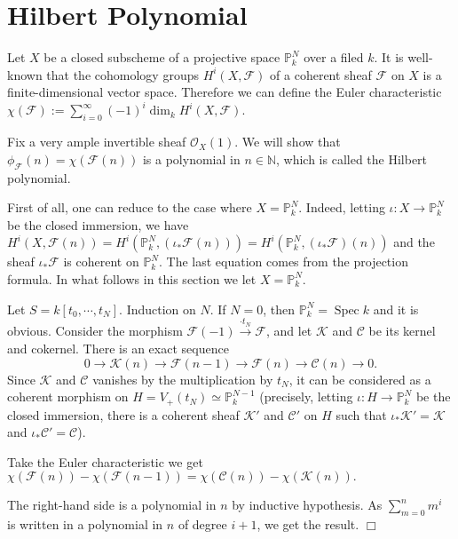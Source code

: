 \documentclass{article}
\theoremstyle{theorem}
\begin{document}
    \section{Hilbert Polynomial}
    Let $X$ be a closed subscheme of a projective space $\mathbb{P}^N_k$ over a filed $k$. It is well-known that the cohomology groups $H^i(X, \mathcal{F})$ of a coherent sheaf $\mathcal F$ on $X$ is a finite-dimensional vector space. Therefore we can define the Euler characteristic $\displaystyle \chi(\mathcal F) := \sum_{i = 0}^{\infty} (-1)^i \dim_k H^i(X, \mathcal{F}).$
    
    Fix a very ample invertible sheaf $\mathcal{O}_X(1)$. We will show that $\phi_{\mathcal F}(n) = \chi(\mathcal F(n))$ is a polynomial in $n \in \mathbb N$, which is called the Hilbert polynomial.
    \newline
    
    First of all, one can reduce to the case where $X =\mathbb{P}^N_k.$ Indeed, letting $\iota : X \rightarrow \mathbb{P}^N_k$ be the closed immersion, we have $H^i(X, \mathcal{F}(n)) = H^i(\mathbb P^N_k, (\iota_*\mathcal{F}(n))) = H^i(\mathbb P^N_k, (\iota_*\mathcal{F})(n))$ and the sheaf $\iota_*\mathcal F$ is coherent on $\mathbb{P}^N_k$. The last equation comes from the projection formula. In what follows in this section we let $X =\mathbb{P}^N_k.$
    
    Let $S = k[t_0, \cdots, t_N]$. Induction on $N$. If $N = 0$, then $\mathbb{P}^N_k = \operatorname{Spec} k$ and it is obvious. Consider the morphism $\mathcal F(-1) \xrightarrow{\cdot t_N} \mathcal F$, and let $\mathcal K$ and $\mathcal C$ be its kernel and cokernel. There is an exact sequence
    $$ 0 \rightarrow \mathcal K(n) \rightarrow \mathcal F(n-1) \rightarrow \mathcal F(n) \rightarrow \mathcal C(n) \rightarrow 0.$$
    Since $\mathcal K$ and $\mathcal C$ vanishes by the multiplication by $t_N$, it can be considered as a coherent morphism on $H = V_+(t_N) \simeq \mathbb{P}^{N-1}_k$ (precisely, letting $\iota : H \rightarrow \mathbb{P}^{N}_k$ be the closed immersion, there is a coherent sheaf $\mathcal K'$ and $\mathcal C'$ on $H$ such that $\iota_*\mathcal K' = \mathcal K$ and $\iota_*\mathcal C' = \mathcal C$).
    
    Take the Euler characteristic we get $\chi(\mathcal F(n)) - \chi(\mathcal F(n-1)) = \chi(\mathcal C(n)) - \chi(\mathcal K(n)).$
    
    The right-hand side is a polynomial in $n$ by inductive hypothesis. As $\displaystyle \sum_{m = 0}^{n} m^i$ is written in a polynomial in $n$ of degree $i+1$, we get the result. $\Box$
    \newline
    
\end{document}
